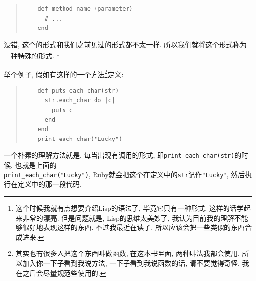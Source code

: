 \begin{quotation}
  \begin{verbatim}
    def method_name (parameter)
      # ...
    end
  \end{verbatim}
\end{quotation}

没错, 这个的形式和我们之前见过的形式都不太一样. 所以我们就将这个形式称为一种特殊的形式. \footnote{这个时候我就有点想要介绍Lisp的语法了, 毕竟它只有一种形式, 这样的话学起来非常的漂亮. 但是问题就是, Lisp的思维太美妙了, 我认为目前我的理解不能够很好地表现这样的东西. 不过我最近在读了, 所以应该会把一些类似的东西合成进来. }

举个例子, 假如有这样的一个方法\footnote{其实也有很多人把这个东西叫做函数, 在这本书里面, 两种叫法我都会使用, 所以加入你一下子看到我说方法, 一下子看到我说函数的话, 请不要觉得奇怪. 我在之后会尽量规范些使用的. }定义: 

\begin{quotation}
  \begin{verbatim}
    def puts_each_char(str)
      str.each_char do |c|
        puts c
      end
    end
    print_each_char("Lucky")
  \end{verbatim}
\end{quotation}

一个朴素的理解方法就是, 每当出现有调用的形式, 即\texttt{print_each_char(str)}的时候, 也就是上面的\\\texttt{print_each_char("Lucky")}, Ruby就会把这个在定义中的\texttt{str}记作\texttt{"Lucky"}, 然后执行在定义中的那一段代码. 

